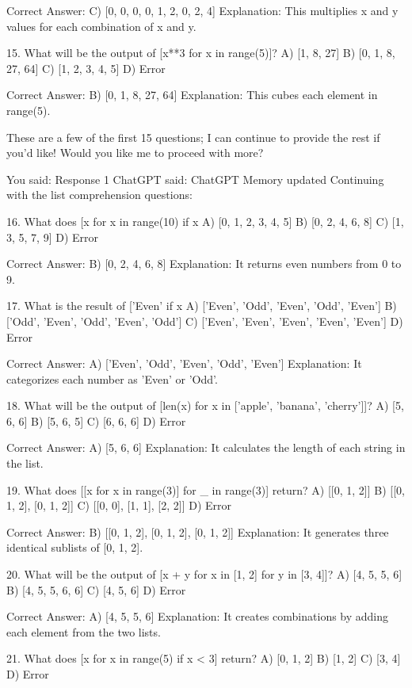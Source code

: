 Correct Answer: C) [0, 0, 0, 0, 1, 2, 0, 2, 4]
Explanation: This multiplies x and y values for each combination of x and y.

15. What will be the output of [x**3 for x in range(5)]?
A) [1, 8, 27]
B) [0, 1, 8, 27, 64]
C) [1, 2, 3, 4, 5]
D) Error

Correct Answer: B) [0, 1, 8, 27, 64]
Explanation: This cubes each element in range(5).

These are a few of the first 15 questions; I can continue to provide the rest if you'd like! Would you like me to proceed with more?






You said:
Response 1
ChatGPT said:
ChatGPT
Memory updated
Continuing with the list comprehension questions:

16. What does [x for x in range(10) if x %
A) [0, 1, 2, 3, 4, 5]
B) [0, 2, 4, 6, 8]
C) [1, 3, 5, 7, 9]
D) Error

Correct Answer: B) [0, 2, 4, 6, 8]
Explanation: It returns even numbers from 0 to 9.

17. What is the result of ['Even' if x %
A) ['Even', 'Odd', 'Even', 'Odd', 'Even']
B) ['Odd', 'Even', 'Odd', 'Even', 'Odd']
C) ['Even', 'Even', 'Even', 'Even', 'Even']
D) Error

Correct Answer: A) ['Even', 'Odd', 'Even', 'Odd', 'Even']
Explanation: It categorizes each number as 'Even' or 'Odd'.

18. What will be the output of [len(x) for x in ['apple', 'banana', 'cherry']]?
A) [5, 6, 6]
B) [5, 6, 5]
C) [6, 6, 6]
D) Error

Correct Answer: A) [5, 6, 6]
Explanation: It calculates the length of each string in the list.

19. What does [[x for x in range(3)] for _ in range(3)] return?
A) [[0, 1, 2]]
B) [[0, 1, 2], [0, 1, 2]]
C) [[0, 0], [1, 1], [2, 2]]
D) Error

Correct Answer: B) [[0, 1, 2], [0, 1, 2], [0, 1, 2]]
Explanation: It generates three identical sublists of [0, 1, 2].

20. What will be the output of [x + y for x in [1, 2] for y in [3, 4]]?
A) [4, 5, 5, 6]
B) [4, 5, 5, 6, 6]
C) [4, 5, 6]
D) Error

Correct Answer: A) [4, 5, 5, 6]
Explanation: It creates combinations by adding each element from the two lists.

21. What does [x for x in range(5) if x < 3] return?
A) [0, 1, 2]
B) [1, 2]
C) [3, 4]
D) Error

